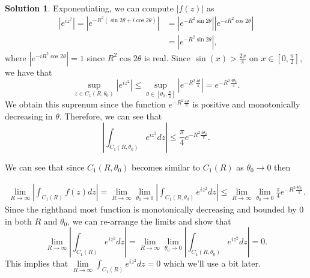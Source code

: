 \documentclass[12pt]{article}
\newcommand{\abs}[1]{ \left| #1 \right| }
\theoremstyle{definition}
\newtheorem{sol}{Solution}
\theoremstyle{remark}
\begin{document}
\begin{sol}
Exponentiating, we can compute $\abs{f(z)}$ as 
\begin{align}
    \abs{e^{iz^2}} = \abs{ e^{-R^2(\sin2\theta + i\cos2\theta)} } &= \abs{e^{-R^2 \sin2\theta}} \abs{e^{-iR^2\cos2\theta}}\\
                                                                  &= \abs{e^{-R^2 \sin2\theta}},
\end{align}
where $\abs{e^{-iR^2\cos2\theta}} =1$ since $R^2\cos2\theta$ is real. Since $\sin(x)> \frac{2x}{\pi}$ on $x\in[0,\frac{\pi}{2}]$, we have that 
\begin{equation}
    \sup_{z\in  C_1(R,\theta_0)} \abs{e^{iz^2}} \leq \sup_{\theta \in [\theta_0, \frac{\pi}{4}]} \abs{e^{-R^2 \frac{4\theta}{\pi}}} = e^{-R^2 \frac{4\theta_0}{\pi}}. 
\end{equation}
We obtain this suprenum since the function $e^{-R^2\frac{4\theta}{\pi}}$ is positive and monotonically decreasing in $\theta$. Therefore, we can see that 
\begin{equation}
    \abs{\int_{C_1(R,\theta_0)} e^{iz^2}dz} \leq  \frac{\pi}{4} e^{-R^2\frac{4\theta_0}{\pi}} .
\end{equation}

We can see that since $C_1(R,\theta_0)$ becomes similar to $C_1(R)$ as $\theta_0 \to 0$ then

\begin{align}
    \lim\limits_{R\to\infty}\abs{\int_{C_1(R)} f(z)dz } = \lim\limits_{R\to\infty}\lim\limits_{\theta_0\to 0} \abs{\int_{C_1(R,\theta_0)} e^{iz^2}dz} \leq  \lim\limits_{R\to\infty}\lim\limits_{\theta_0\to 0}\frac{\pi}{4} e^{-R^2\frac{4\theta_0}{\pi}}.
\end{align}
    Since the righthand most function is monotonically decreasing and bounded by 0 in both $R$ and $\theta_0$, we can re-arrange the limits and show that 
    \begin{equation}
        \lim\limits_{R\to\infty}\abs{\int_{C_1(R)}  e^{iz^2}dz } = \lim\limits_{R\to\infty}\lim\limits_{\theta_0\to 0} \abs{\int_{C_1(R,\theta_0)} e^{iz^2}dz} = 0.
    \end{equation}
    This implies that $\lim\limits_{R\to\infty}\int_{C_1(R)}  e^{iz^2}dz = 0$ which we'll use a bit later.


\end{sol}
\end{document}
